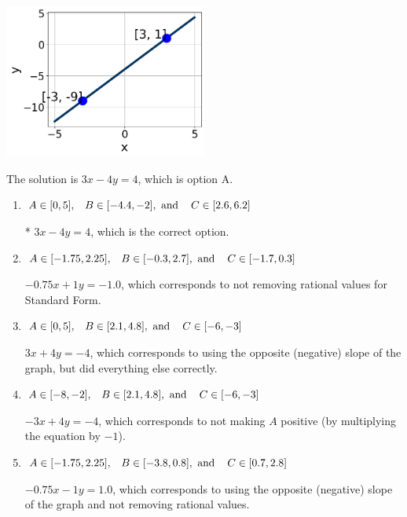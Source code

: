 \documentclass{extbook}[14pt]
\begin{document}
\begin{enumerate}
{\begin{center}
    \includegraphics[width=0.5\textwidth]{../Figures/linearGraphToStandardB.png}
\end{center}




The solution is \( 3x - 4y = 4 \), which is option A.\begin{enumerate}[label=\Alph*.]
\item \( A \in [0, 5], \hspace{3mm} B \in [-4.4, -2], \text{ and } \hspace{3mm} C \in [2.6, 6.2] \)

* $3x - 4y = 4$, which is the correct option.
\item \( A \in [-1.75, 2.25], \hspace{3mm} B \in [-0.3, 2.7], \text{ and } \hspace{3mm} C \in [-1.7, 0.3] \)

 $-0.75x + 1y = -1.0$, which corresponds to not removing rational values for Standard Form.
\item \( A \in [0, 5], \hspace{3mm} B \in [2.1, 4.8], \text{ and } \hspace{3mm} C \in [-6, -3] \)

 $3x + 4y = -4$, which corresponds to using the opposite (negative) slope of the graph, but did everything else correctly.
\item \( A \in [-8, -2], \hspace{3mm} B \in [2.1, 4.8], \text{ and } \hspace{3mm} C \in [-6, -3] \)

 $-3x + 4y = -4$, which corresponds to not making $A$ positive (by multiplying the equation by $-1$).
\item \( A \in [-1.75, 2.25], \hspace{3mm} B \in [-3.8, 0.8], \text{ and } \hspace{3mm} C \in [0.7, 2.8] \)

 $-0.75x - 1y = 1.0$, which corresponds to using the opposite (negative) slope of the graph and not removing rational values.
\end{enumerate}

}
\end{enumerate}
\end{document}
